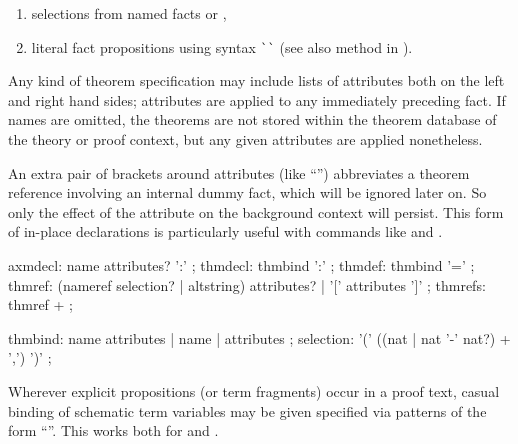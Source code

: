 \begin{isabellebody}
\begin{isamarkuptext}
\begin{enumerate}
  \item selections from named facts  or ,

  \item literal fact propositions using \hyperlink{syntax.altstring}{\mbox{}} syntax
  \verb|`|\isa{{\isachardoublequote}{\isasymphi}{\isachardoublequote}}\verb|`| (see also method
  \hyperlink{method.fact}{\mbox{}} in ).

  \end{enumerate}

  Any kind of theorem specification may include lists of attributes
  both on the left and right hand sides; attributes are applied to any
  immediately preceding fact.  If names are omitted, the theorems are
  not stored within the theorem database of the theory or proof
  context, but any given attributes are applied nonetheless.

  An extra pair of brackets around attributes (like ``'') abbreviates a theorem reference involving an
  internal dummy fact, which will be ignored later on.  So only the
  effect of the attribute on the background context will persist.
  This form of in-place declarations is particularly useful with
  commands like \hyperlink{command.declare}{\mbox{}} and \hyperlink{command.using}{\mbox{}}.

  \begin{rail}
    axmdecl: name attributes? ':'
    ;
    thmdecl: thmbind ':'
    ;
    thmdef: thmbind '='
    ;
    thmref: (nameref selection? | altstring) attributes? | '[' attributes ']'
    ;
    thmrefs: thmref +
    ;

    thmbind: name attributes | name | attributes
    ;
    selection: '(' ((nat | nat '-' nat?) + ',') ')'
    ;
  \end{rail}%
\end{isamarkuptext}%
\isamarkuptrue%
%
\isamarkuptrue%
%
\begin{isamarkuptext}%
Wherever explicit propositions (or term fragments) occur in a proof
  text, casual binding of schematic term variables may be given
  specified via patterns of the form ``''.  This works both for  and .


\end{isamarkuptext}
\end{isabellebody}
